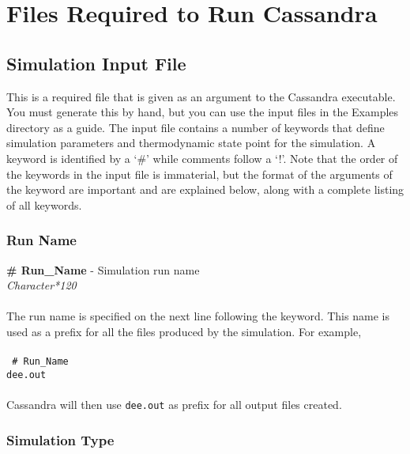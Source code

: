 \chapter{Files Required to Run Cassandra}

\section{Simulation Input File} \label{Sec:Input_File}
This is a required file that is given as an argument to the Cassandra
executable. You must generate this by hand, but you can use the input files in the Examples directory as a guide. The input file contains a number of keywords that define simulation parameters
and thermodynamic state point for the simulation. A keyword is identified
by a `\#' while comments follow a `!'. Note that the order of the keywords in the input
file is immaterial, but the format of the arguments of the keyword are
important and are explained below, along with a complete listing of
all keywords. 
%
%
%
\subsection{Run Name}\label{sec:Run_Name}
{\bf \# Run\_Name}  - Simulation run name\\
{\it Character*120} \\ \\
%
The run name is specified on the next line following the keyword. This name is used as a prefix for all the files
produced by the simulation. For example,\\ \\
%
{\tt{
\# Run\_Name \\
dee.out
}} \\ \\
%
Cassandra will then use \texttt{dee.out} as prefix for all output files created.

%
%
%
\subsection{Simulation Type}\label{sec:Sim_Type}

